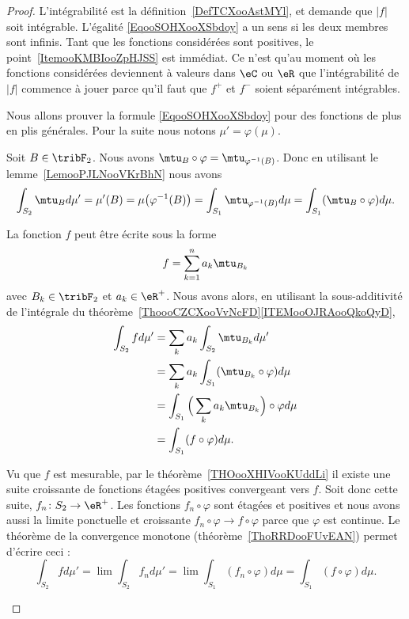 \begin{proof}
	L'intégrabilité est la définition~\ref{DefTCXooAstMYl}, et demande que \( | f |\) soit intégrable. L'égalité \eqref{EqooSOHXooXSbdoy} a un sens si les deux membres sont infinis. Tant que les fonctions considérées sont positives, le point~\ref{ItemooKMBIooZpHJSS} est immédiat. Ce n'est qu'au moment où les fonctions considérées deviennent à valeurs dans \( \eC\) ou \( \eR\) que l'intégrabilité de \( | f |\) commence à jouer parce qu'il faut que \(  f^+  \) et \( f^-\) soient séparément intégrables.

	Nous allons prouver la formule \eqref{EqooSOHXooXSbdoy} pour des fonctions de plus en plis générales. Pour la suite nous notons \( \mu'=\varphi(\mu)\).

	\begin{subproof}
		\spitem[Pour \( f=\mtu_B\), \( B \) mesurable]
		Soit \( B\in\tribF_2 \). Nous avons \( \mtu_B\circ\varphi=\mtu_{\varphi^{-1}(B)}\). Donc en utilisant le lemme~\ref{LemooPJLNooVKrBhN} nous avons
		\begin{equation}
			\int_{S_2}\mtu_{B}d\mu'=\mu'(B)=\mu\big( \varphi^{-1}(B) \big)=\int_{S_1}\mtu_{\varphi^{-1}(B)}d\mu=\int_{S_1}(\mtu_B\circ \varphi)d\mu.
		\end{equation}

		La fonction \( f\) peut être écrite sous la forme
		\begin{equation}
			f=\sum_{k=1}^na_k\mtu_{B_k}
		\end{equation}
		avec \( B_k\in\tribF_2\) et \( a_k\in \eR^+\). Nous avons alors, en utilisant la sous-additivité de l'intégrale du théorème~\ref{ThoooCZCXooVvNcFD}\ref{ITEMooOJRAooQkoQyD},
		\begin{subequations}
			\begin{align}
				\int_{S_2}fd\mu' & =\sum_ka_k\int_{S_2}\mtu_{B_k}d\mu'                          \\
				                 & =\sum_ka_k\int_{S_1}(\mtu_{B_k}\circ\varphi)d\mu             \\
				                 & =\int_{S_1}\Big( \sum_ka_k\mtu_{B_k} \Big)\circ \varphi d\mu \\
				                 & =\int_{S_1}(f\circ\varphi)d\mu.
			\end{align}
		\end{subequations}

		Vu que \( f\) est mesurable, par le théorème~\ref{THOooXHIVooKUddLi} il existe une suite croissante de fonctions étagées positives convergeant vers \( f\). Soit donc cette suite, \( f_n\colon S_2\to \eR^+\). Les fonctions \( f_n\circ\varphi\) sont étagées et positives et nous avons aussi la limite ponctuelle et croissante \( f_n\circ\varphi\to f\circ\varphi\) parce que \( \varphi\) est continue. Le théorème de la convergence monotone (théorème~\ref{ThoRRDooFUvEAN}) permet d'écrire ceci :
		\begin{equation}
			\int_{S_2}fd\mu'=\lim\int_{S_2}f_nd\mu'= \lim\int_{S_1}(f_n\circ\varphi)d\mu=\int_{S_1}(f\circ\varphi)d\mu.
		\end{equation}


\end{subproof}
\end{proof}
